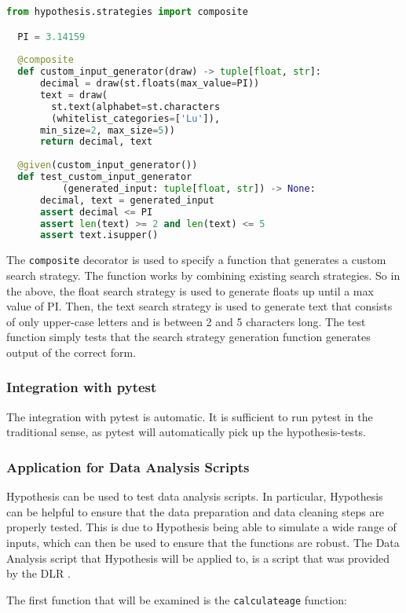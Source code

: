 \documentclass[runningheads]{llncs}
\begin{document}
\begin{lstlisting}[language=Python,caption={Complex Input Example from code/tutorial.ipynb}]
  from hypothesis.strategies import composite

  PI = 3.14159
  
  @composite
  def custom_input_generator(draw) -> tuple[float, str]:
      decimal = draw(st.floats(max_value=PI))
      text = draw(
        st.text(alphabet=st.characters
        (whitelist_categories=['Lu']), 
      min_size=2, max_size=5))
      return decimal, text
  
  @given(custom_input_generator())
  def test_custom_input_generator
          (generated_input: tuple[float, str]) -> None:
      decimal, text = generated_input
      assert decimal <= PI
      assert len(text) >= 2 and len(text) <= 5
      assert text.isupper()
\end{lstlisting}
The \texttt{composite} decorator is used to specify a function that generates a custom search strategy. The function works by combining existing search strategies. So in the above, the float search strategy is used to generate floats up until a max value of PI. Then, the text search strategy is used to generate text that consists of only upper-case letters and is between 2 and 5 characters long. The test function simply tests that the search strategy generation function generates output of the correct form.

\subsubsection{Integration with pytest}
The integration with pytest is automatic. It is sufficient to run pytest in the traditional sense, as pytest will automatically pick up the hypothesis-tests.

\subsubsection{Application for Data Analysis Scripts}
Hypothesis can be used to test data analysis scripts. In particular, Hypothesis can be helpful to ensure that the data preparation and data cleaning steps are properly tested. This is due to Hypothesis being able to simulate a wide range of inputs, which can then be used to ensure that the functions are robust. The Data Analysis script that Hypothesis will be applied to, is a script that was provided by the DLR \cite{Stoffers2021Astronaut}.

\vspace{5mm}
\noindent The first function that will be examined is the \texttt{calculateage} function:
\end{document}
